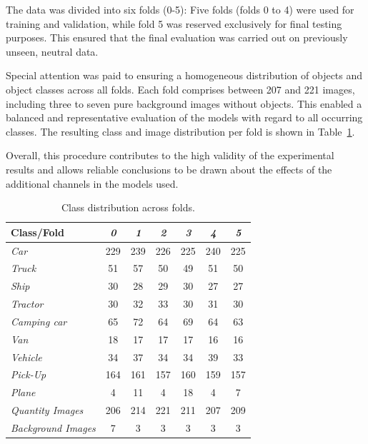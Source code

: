 The data was divided into six folds (0-5): Five folds (folds 0 to 4) were used for training and validation, while fold 5 was reserved exclusively for final testing purposes. This ensured that the final evaluation was carried out on previously unseen, neutral data.

Special attention was paid to ensuring a homogeneous distribution of objects and object classes across all folds. Each fold comprises between 207 and 221 images, including three to seven pure background images without objects. This enabled a balanced and representative evaluation of the models with regard to all occurring classes. The resulting class and image distribution per fold is shown in Table~\ref{tab:fold_distribution}.

Overall, this procedure contributes to the high validity of the experimental results and allows reliable conclusions to be drawn about the effects of the additional channels in the models used.


\begin{table}[h!]
\centering
\begin{tabular}{lcccccc}
\textbf{Class/Fold} & \textit{0} & \textit{1} & \textit{2} & \textit{3} & \textit{4} & \textit{5} \\
\hline
\textit{Car}              & 229 & 239 & 226 & 225 & 240 & 225 \\
\textit{Truck}            & 51  & 57  & 50  & 49  & 51  & 50  \\
\textit{Ship}             & 30  & 28  & 29  & 30  & 27  & 27  \\
\textit{Tractor}          & 30  & 32  & 33  & 30  & 31  & 30  \\
\textit{Camping car}      & 65  & 72  & 64  & 69  & 64  & 63  \\
\textit{Van}              & 18  & 17  & 17  & 17  & 16  & 16  \\
\textit{Vehicle}          & 34  & 37  & 34  & 34  & 39  & 33  \\
\textit{Pick-Up}          & 164 & 161 & 157 & 160 & 159 & 157 \\
\textit{Plane}            & 4   & 11  & 4   & 18  & 4   & 7   \\
\textit{Quantity Images}  & 206 & 214 & 221 & 211 & 207 & 209 \\
\textit{Background Images}& 7   & 3   & 3   & 3   & 3   & 3   \\
\hline
\end{tabular}
\caption{Class distribution across folds.}
\label{tab:fold_distribution}
\end{table}



